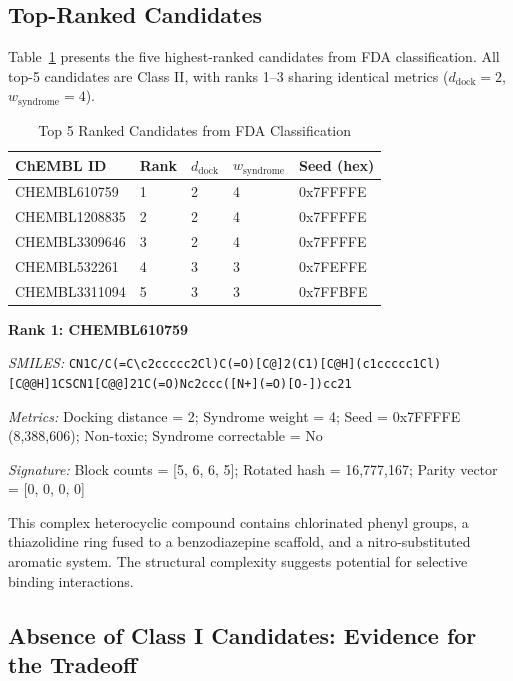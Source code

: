 \documentclass[12pt,a4paper]{article}
\begin{document}
\subsection{Top-Ranked Candidates}

Table~\ref{tab:top5} presents the five highest-ranked candidates from FDA classification. All top-5 candidates are Class II, with ranks 1--3 sharing identical metrics ($d_{\text{dock}} = 2$, $w_{\text{syndrome}} = 4$).

\begin{table}[H]
\centering
\caption{Top 5 Ranked Candidates from FDA Classification}
\label{tab:top5}
\small
\begin{tabular}{p{2.5cm}p{1.5cm}p{1.5cm}p{1.5cm}p{6cm}}
\toprule
\textbf{ChEMBL ID} & \textbf{Rank} & \textbf{$d_{\text{dock}}$} & \textbf{$w_{\text{syndrome}}$} & \textbf{Seed (hex)} \\
\midrule
CHEMBL610759 & 1 & 2 & 4 & 0x7FFFFE \\
CHEMBL1208835 & 2 & 2 & 4 & 0x7FFFFE \\
CHEMBL3309646 & 3 & 2 & 4 & 0x7FFFFE \\
CHEMBL532261 & 4 & 3 & 3 & 0x7FEFFE \\
CHEMBL3311094 & 5 & 3 & 3 & 0x7FFBFE \\
\bottomrule
\end{tabular}
\end{table}

\textbf{Rank 1: CHEMBL610759}

\textit{SMILES:} \texttt{CN1C/C(=C\textbackslash{}c2ccccc2Cl)C(=O)[C@]2(C1)[C@H](c1ccccc1Cl)[C@@H]1CSCN1[C@@]21C(=O)Nc2ccc([N+](=O)[O-])cc21}

\textit{Metrics:} Docking distance = 2; Syndrome weight = 4; Seed = 0x7FFFFE (8,388,606); Non-toxic; Syndrome correctable = No

\textit{Signature:} Block counts = [5, 6, 6, 5]; Rotated hash = 16,777,167; Parity vector = [0, 0, 0, 0]

This complex heterocyclic compound contains chlorinated phenyl groups, a thiazolidine ring fused to a benzodiazepine scaffold, and a nitro-substituted aromatic system. The structural complexity suggests potential for selective binding interactions.

\subsection{Absence of Class I Candidates: Evidence for the Tradeoff}
\end{document}
